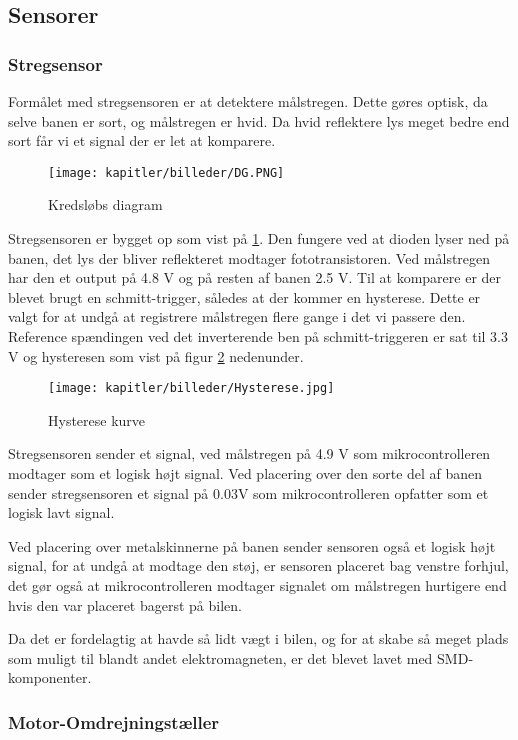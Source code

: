 \newpage
\subsection{Sensorer}


\subsubsection{Stregsensor}
Formålet med stregsensoren er at detektere målstregen. Dette gøres optisk, da selve banen er sort, og målstregen er hvid. Da hvid reflektere lys meget bedre end sort får vi et signal der er let at komparere.
\begin{figure}[ht]
	\centering
	\texttt{[image: kapitler/billeder/DG.PNG]}
	\caption{Kredsløbs diagram}
	\label{fig:DG}
\end{figure}
Stregsensoren er bygget op som vist på \ref{fig:DG}. Den fungere ved at dioden lyser ned på banen, det lys der bliver reflekteret modtager fototransistoren. Ved målstregen har den et output på 4.8 V og på resten af banen 2.5 V. Til at komparere er der blevet brugt en schmitt-trigger, således at der kommer en hysterese. Dette er valgt for at undgå at registrere målstregen flere gange i det vi passere den. Reference spændingen ved det inverterende ben på schmitt-triggeren er sat til 3.3 V og hysteresen som vist på figur \ref{fig:hys} nedenunder.

\begin{figure}[ht]
	\centering
	\texttt{[image: kapitler/billeder/Hysterese.jpg]}
	\caption{Hysterese kurve}
	\label{fig:hys}
\end{figure}

Stregsensoren sender et signal, ved målstregen på 4.9 V som  mikrocontrolleren modtager som et logisk højt signal. Ved placering over den sorte del af banen sender stregsensoren et signal på 0.03V som mikrocontrolleren opfatter som et logisk lavt signal.

Ved placering over metalskinnerne på banen sender sensoren også et logisk højt signal, for at undgå at modtage den støj, er sensoren placeret bag venstre forhjul, det gør også at mikrocontrolleren modtager signalet om målstregen hurtigere end hvis den var placeret bagerst på bilen.

Da det er fordelagtig at havde så lidt vægt i bilen, og for at skabe så meget plads som muligt til blandt andet elektromagneten, er det blevet lavet med SMD-komponenter.


\subsubsection{Motor-Omdrejningstæller}
\label{motor-omdrej}

